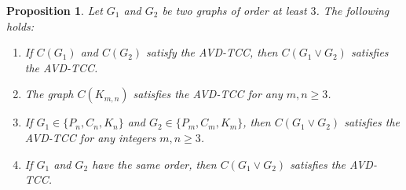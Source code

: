 \documentclass[12pt,reqno,a4paper]{amsart}
\theoremstyle{definition}
\theoremstyle{plain}
\newtheorem{prop}[defn]{Proposition}
\begin{document}
\begin{prop}\label{Proposition 5.4}
Let $G_1$ and $G_2$ be two graphs of order at least $3$. The following holds:
\begin{enumerate}
    \item If $C(G_{1})$ and $C(G_{2})$ satisfy the AVD-TCC, then $C(G_{1} \vee G_{2})$ satisfies the AVD-TCC.
    \item The graph $C(K_{m,n})$ satisfies the AVD-TCC for any $m,n\geq 3$.
    \item If $G_{1}\in\{P_{n},C_{n},K_{n}\}$ and
    $G_{2}\in\{P_{m},C_{m},K_{m}\}$, then
    $C(G_{1}\vee G_{2})$ satisfies the AVD-TCC for any integers $m,n\geq3$.
    \item If $G_{1}$ and $G_{2}$ have the same order, then $C(G_{1} \vee G_{2})$ satisfies the AVD-TCC.
\end{enumerate}
\end{prop}
\end{document}
